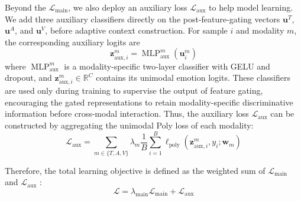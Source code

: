 \documentclass[letterpaper]{article} %
\begin{document}
Beyond the $\mathcal{L}_{\mathrm{main}}$, we also deploy an auxiliary loss $\mathcal{L}_{\mathrm{aux}}$ to help model learning. We add three auxiliary classifiers  directly on the post-feature-gating vectors $\mathbf{u}^{T}$, $\mathbf{u}^{A}$, and
$\mathbf{u}^{V}$, before adaptive context construction. For sample $i$ and modality $m$, the corresponding auxiliary logits are 
\begin{equation}
\mathbf{z}_{\mathrm{aux},i}^{m}
=\operatorname{MLP}_{\mathrm{aux}}^{m}
  (\mathbf{u}_{i}^{m})
\label{eq:auxiliary_classifier}
\end{equation}  
where $\operatorname{MLP}_{\mathrm{aux}}^{m}$ is a modality-specific
two-layer classifier with GELU and dropout, and
$\mathbf{z}_{\mathrm{aux},i}^{m}\in\mathbb{R}^{C}$ contains its
unimodal emotion logits. These classifiers are used only during training to supervise the output of feature gating, encouraging the gated representations to retain modality-specific discriminative information before cross-modal interaction. Thus, the auxiliary loss $\mathcal{L}_{\mathrm{aux}}$ can be constructed by aggregating the unimodal Poly loss of each modality:
\begin{equation}
\mathcal{L}_{\mathrm{aux}}
= \sum_{m\in\{T,A,V\}}\lambda_m\frac{1}{B}\sum_{i=1}^{B}
  \ell_{\mathrm{poly}}
  (\mathbf{z}^{m}_{\mathrm{aux},i},y_i;\mathbf{w}_{m})
\label{eq:unimodal_losses}
\end{equation}

Therefore, the total learning objective is defined as the weighted sum of $\mathcal{L}_{\mathrm{main}}$
 and $\mathcal{L}_{\mathrm{aux}}$
:
\begin{equation}
\mathcal{L}
=\lambda_{\mathrm{main}}\mathcal{L}_{\mathrm{main}} + \mathcal{L}_{\mathrm{aux}}
\label{eq:training_objective}
\end{equation}








\end{document}
